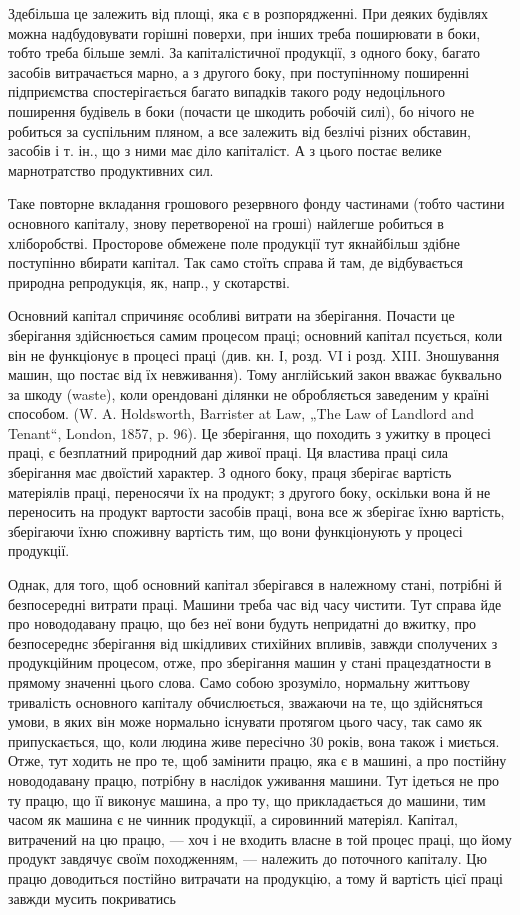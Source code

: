 Здебільша це залежить від площі, яка є в розпорядженні. При деяких будівлях можна надбудовувати
горішні поверхи, при інших треба поширювати в боки, тобто треба більше землі. За капіталістичної
продукції, з одного боку, багато засобів витрачається марно, а з другого боку, при поступінному
поширенні підприємства спостерігається багато випадків такого роду недоцільного поширення будівель в
боки (почасти це шкодить робочій силі), бо нічого не робиться за суспільним пляном, а все залежить
від безлічі різних обставин, засобів і т. ін., що з ними має діло капіталіст. А з цього постає
велике марнотратство продуктивних сил.

Таке повторне вкладання грошового резервного фонду частинами (тобто частини основного капіталу,
знову перетвореної на гроші) найлегше робиться в хліборобстві. Просторове обмежене поле продукції
тут якнайбільш здібне поступінно вбирати капітал. Так само стоїть справа й там, де відбувається
природна репродукція, як, напр., у скотарстві.

Основний капітал спричиняє особливі витрати на зберігання. Почасти це зберігання здійснюється самим
процесом праці; основний капітал псується, коли він не функціонує в процесі праці (див. кн. І, розд.
VI і розд. XIII. Зношування машин, що постає від їх невживання). Тому англійський закон вважає
буквально за шкоду (waste), коли орендовані ділянки не обробляється заведеним у країні способом. (W.
A. Holdsworth, Barrister at Law, „The Law of Landlord and Tenant“, London, 1857, p. 96). Це
зберігання, що походить з ужитку в процесі праці, є безплатний природний дар живої праці. Ця
властива праці сила зберігання має двоїстий характер. З одного боку, праця зберігає вартість
матеріялів праці, переносячи їх на продукт; з другого боку, оскільки вона й не переносить на продукт
вартости засобів праці, вона все ж зберігає їхню вартість, зберігаючи їхню споживну вартість тим, що
вони функціонують у процесі продукції.

Однак, для того, щоб основний капітал зберігався в належному стані, потрібні й безпосередні витрати
праці. Машини треба час від часу чистити. Тут справа йде про новододавану працю, що без неї вони
будуть непридатні до вжитку, про безпосереднє зберігання від шкідливих стихійних впливів, завжди
сполучених з продукційним процесом, отже, про зберігання машин у стані працездатности в прямому
значенні цього слова. Само собою зрозуміло, нормальну життьову тривалість основного капіталу
обчислюється, зважаючи на те, що здійсняться умови, в яких він може нормально існувати протягом
цього часу, так само як припускається, що, коли людина живе пересічно 30 років, вона також і
миється. Отже, тут ходить не про те, щоб замінити працю, яка є в машині, а про постійну новододавану
працю, потрібну в наслідок уживання машини. Тут ідеться не про ту працю, що її виконує машина, а про
ту, що прикладається до машини, тим часом як машина є не чинник продукції, а сировинний
матеріял. Капітал, витрачений на цю працю, — хоч і не входить власне в той процес праці, що йому
продукт завдячує своїм походженням, — належить до поточного капіталу. Цю працю доводиться постійно
витрачати на продукцію, а тому й вартість цієї праці завжди мусить покриватись
